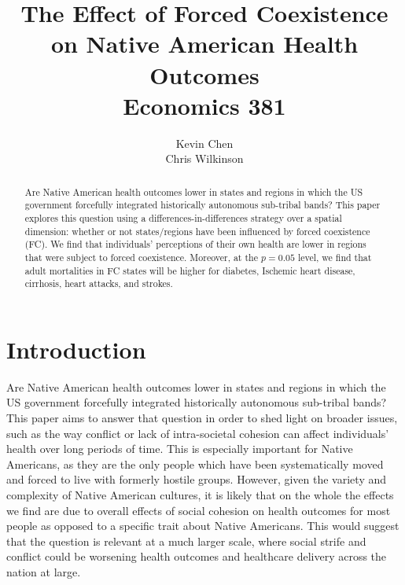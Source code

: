 \documentclass[12pt]{article}
\title{
The Effect of Forced Coexistence \\ on Native American Health Outcomes \\ 
{\small \sc Economics 381}
}
\author{Kevin Chen \\ Chris Wilkinson}
\begin{document}

\maketitle

\begin{abstract}
Are Native American health outcomes lower in states and regions in which the US government forcefully integrated historically autonomous sub-tribal bands? This paper explores this question using a differences-in-differences strategy over a spatial dimension: whether or not states/regions have been influenced by forced coexistence (FC). We find that individuals' perceptions of their own health are lower in regions that were subject to forced coexistence. Moreover, at the $p = 0.05$ level, we find that adult mortalities in FC states will be higher for diabetes, Ischemic heart disease, cirrhosis, heart attacks, and strokes.
\end{abstract}

\newpage


\doublespacing

\section{Introduction}
Are Native American health outcomes lower in states and regions in which the US government forcefully integrated historically autonomous sub-tribal bands? 
This paper aims to answer that question in order to shed light on broader issues, such as the way conflict or lack of intra-societal cohesion can affect individuals’ health over long periods of time.
This is especially important for Native Americans, as they are the only people which have been systematically moved and forced to live with formerly hostile groups.
However, given the variety and complexity of Native American cultures, it is likely that on the whole the effects we find are due to overall effects of social cohesion on health outcomes for most people as opposed to a specific trait about Native Americans.
This would suggest that the question is relevant at a much larger scale, where social strife and conflict could be worsening health outcomes and healthcare delivery across the nation at large.
\end{document}
